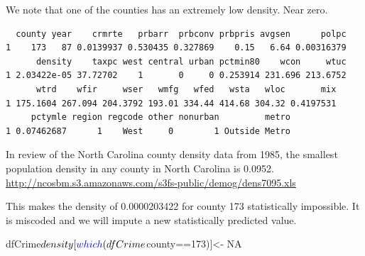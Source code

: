 \documentclass[]{article}
\newenvironment{Shaded}{}{}
\newcommand{\DecValTok}[1]{#1}
\newcommand{\FloatTok}[1]{#1}
\newcommand{\KeywordTok}[1]{\textcolor[rgb]{0.00,0.00,1.00}{#1}}
\newcommand{\NormalTok}[1]{#1}
\newcommand{\OperatorTok}[1]{#1}
\newcommand{\OtherTok}[1]{\textcolor[rgb]{1.00,0.25,0.00}{#1}}
\newcommand{\StringTok}[1]{\textcolor[rgb]{0.00,0.50,0.50}{#1}}
\begin{document}
We note that one of the counties has an extremely low density. Near
zero.

\begin{Shaded}
\end{Shaded}

\begin{verbatim}
  county year    crmrte   prbarr  prbconv prbpris avgsen      polpc
1    173   87 0.0139937 0.530435 0.327869    0.15   6.64 0.00316379
      density    taxpc west central urban pctmin80    wcon     wtuc
1 2.03422e-05 37.72702    1       0     0 0.253914 231.696 213.6752
      wtrd    wfir     wser   wmfg   wfed   wsta   wloc       mix
1 175.1604 267.094 204.3792 193.01 334.44 414.68 304.32 0.4197531
     pctymle region regcode other nonurban         metro
1 0.07462687      1    West     0        1 Outside Metro
\end{verbatim}

In review of the North Carolina county density data from 1985, the
smallest population density in any county in North Carolina is 0.0952.
\url{http://ncosbm.s3.amazonaws.com/s3fs-public/demog/dens7095.xls}

This makes the density of 0.0000203422 for county 173 statistically
impossible. It is miscoded and we will impute a new statistically
predicted value.

\begin{Shaded}
\begin{Highlighting}[]
\NormalTok{dfCrime}\OperatorTok{$}\NormalTok{density[}\KeywordTok{which}\NormalTok{(dfCrime}\OperatorTok{$}\NormalTok{county}\OperatorTok{==}\DecValTok{173}\NormalTok{)]<-}\StringTok{ }\OtherTok{NA}
\end{Highlighting}
\end{Shaded}
\end{document}

